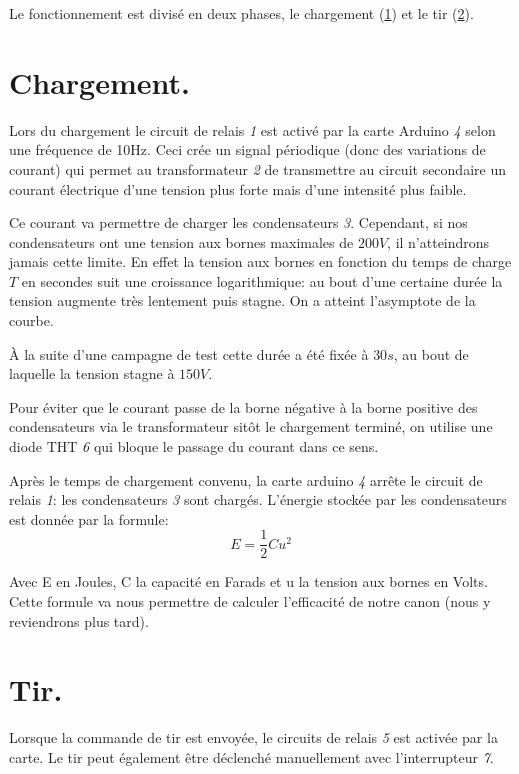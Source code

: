 Le fonctionnement est divisé en deux phases, le chargement (\ref{gauss_charg}) et le
tir (\ref{gauss_tir}).

\section{Chargement.} \label{gauss_charg}

Lors du chargement le circuit de relais \emph{1} est activé par la
carte Arduino \emph{4} selon une fréquence de 10Hz. Ceci crée un
signal périodique (donc des variations de courant) qui permet
au transformateur \emph{2} de transmettre au circuit secondaire un
courant électrique d'une tension plus forte mais d'une
intensité plus faible.

Ce courant va permettre de charger les condensateurs \emph{3}.
Cependant, si nos condensateurs ont une tension aux bornes
maximales de $200 V$, il n'atteindrons jamais cette limite. En
effet la tension aux bornes en fonction du temps de charge $T$ en
secondes suit une croissance logarithmique: au bout d'une
certaine durée la tension augmente très lentement puis stagne.
On a atteint l'asymptote de la courbe.

À la suite d'une campagne de test cette durée a été fixée à $30
s$, au bout de laquelle la tension stagne à $150 V$.

Pour éviter que le courant passe de la borne négative à la borne
positive des condensateurs via le transformateur sitôt le
chargement terminé, on utilise une diode THT \emph{6} qui bloque le
passage du courant dans ce sens.

Après le temps de chargement convenu, la carte arduino \emph{4}
arrête le circuit de relais \emph{1}: les condensateurs \emph{3} sont
chargés. L'énergie stockée par les condensateurs est donnée par
la formule:
\begin{equation}
	E = \frac{1}{2}Cu^2
\end{equation}

Avec E en Joules, C la capacité en Farads et u la tension aux
bornes en   Volts. Cette formule va nous permettre de calculer
l'efficacité de notre   canon (nous y reviendrons plus tard).

\section{Tir.} \label{gauss_tir}

Lorsque la commande de tir est envoyée, le circuits de relais
\emph{5} est activée par la carte. Le tir peut également être
déclenché manuellement avec l'interrupteur \emph{7}.

